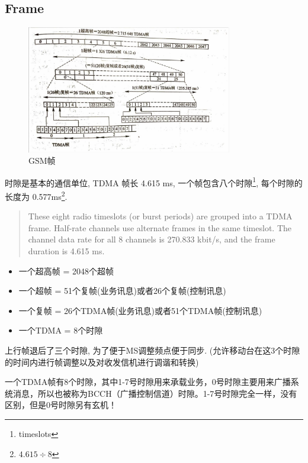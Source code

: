 \documentclass[a4paper]{report}
\begin{document}
 \subsection{Frame} 
 \label{sec:gsm:frame}
\begin{figure}
\centering
\includegraphics[width=0.8\textwidth]{gsm_frame.jpg}
\caption{GSM帧}
\end{figure}
时隙是基本的通信单位, TDMA 帧长 4.615 ms, 一个帧包含八个时隙\footnote{timeslots}, 每个时隙的长度为 0.577ms\footnote{$4.615\div 8$}. 
\begin{quotation}
	 These eight radio timeslots (or burst periods) are grouped into a TDMA frame. Half-rate channels use alternate frames in the same timeslot. The channel data rate for all 8 channels is 270.833 kbit/s, and the frame duration is 4.615 ms.
\end{quotation}
\begin{itemize}
	\item 一个超高帧 = 2048个超帧
	\item 一个超帧 = 51个复帧(业务讯息)或者26个复帧(控制讯息)
	\item 一个复帧 = 26个TDMA帧(业务讯息)或者51个TDMA帧(控制讯息)
	\item 一个TDMA = 8个时隙
\end{itemize}

上行帧退后了三个时隙, 为了便于MS调整频点便于同步. (允许移动台在这3个时隙的时间内进行帧调整以及对收发信机进行调谐和转换)

一个TDMA帧有8个时隙，其中1-7号时隙用来承载业务，0号时隙主要用来广播系统消息，所以也被称为BCCH（广播控制信道）时隙。1-7号时隙完全一样，没有区别，但是0号时隙另有玄机！
\end{document}
